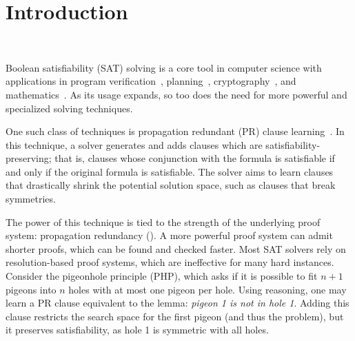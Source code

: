 \section{Introduction}~\label{sec:intro}


Boolean satisfiability (SAT) solving is a core tool in computer science with
applications in program
verification~\cite{BillionQueries,sat-hardwareverification,ic3,bmc},
planning~\cite{planning,planningassat}, cryptography~\cite{cryptominisat}, and
mathematics~\cite{chromaticnumber,pythagoreantriples,kellersconjecture,emptyhexagon}.
As its usage expands, so too does the need for more powerful and specialized
solving techniques.



One such class of techniques is propagation redundant (PR) clause
learning~\cite{prclauses}. In this technique, a solver generates and adds
clauses which are satisfiability-preserving; that is, clauses whose conjunction
with the formula is satisfiable if and only if the original formula is
satisfiable. The solver aims to learn clauses that drastically shrink the
potential solution space, such as clauses that break symmetries.




The power of this technique is tied to the strength of the underlying proof
system: propagation redundancy (\pr). A more powerful proof system can admit
shorter proofs, which can be found and checked faster. Most SAT solvers rely on
resolution-based proof systems, which are ineffective for many hard instances.
Consider the pigeonhole principle (PHP), which asks if it is possible to fit
$n+1$ pigeons into $n$ holes with at most one pigeon per hole. Using \pr
reasoning, one may learn a PR clause equivalent to the lemma: \emph{pigeon 1 is
not in hole 1}. Adding this clause restricts the search space for the first
pigeon (and thus the problem), but it preserves satisfiability, as hole 1 is
symmetric with all holes. 

